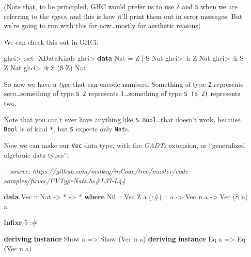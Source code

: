 \documentclass[]{article}
\newenvironment{Shaded}{}{}
\newcommand{\CommentTok}[1]{\textcolor[rgb]{0.38,0.63,0.69}{\textit{#1}}}
\newcommand{\DataTypeTok}[1]{\textcolor[rgb]{0.56,0.13,0.00}{#1}}
\newcommand{\DecValTok}[1]{\textcolor[rgb]{0.25,0.63,0.44}{#1}}
\newcommand{\FunctionTok}[1]{\textcolor[rgb]{0.02,0.16,0.49}{#1}}
\newcommand{\KeywordTok}[1]{\textcolor[rgb]{0.00,0.44,0.13}{\textbf{#1}}}
\newcommand{\NormalTok}[1]{#1}
\newcommand{\OtherTok}[1]{\textcolor[rgb]{0.00,0.44,0.13}{#1}}
\begin{document}
(Note that, to be principled, GHC would prefer us to use
\texttt{\textquotesingle{}Z} and \texttt{\textquotesingle{}S} when we are
referring to the \emph{types}, and this is how it'll print them out in error
messages. But we're going to run with this for now\ldots{}mostly for aesthetic
reasons)

We can check this out in GHCi:

\begin{Shaded}
\begin{Highlighting}[]
\NormalTok{ghci}\FunctionTok{>} \FunctionTok{:}\NormalTok{set }\FunctionTok{-}\DataTypeTok{XDataKinds}
\NormalTok{ghci}\FunctionTok{>} \KeywordTok{data} \DataTypeTok{Nat} \FunctionTok{=} \DataTypeTok{Z} \FunctionTok{|} \DataTypeTok{S} \DataTypeTok{Nat}
\NormalTok{ghci}\FunctionTok{>} \FunctionTok{:}\NormalTok{k }\DataTypeTok{Z}
\DataTypeTok{Nat}
\NormalTok{ghci}\FunctionTok{>} \FunctionTok{:}\NormalTok{k }\DataTypeTok{S} \DataTypeTok{Z}
\DataTypeTok{Nat}
\NormalTok{ghci}\FunctionTok{>} \FunctionTok{:}\NormalTok{k }\DataTypeTok{S}\NormalTok{ (}\DataTypeTok{S} \DataTypeTok{Z}\NormalTok{)}
\DataTypeTok{Nat}
\end{Highlighting}
\end{Shaded}

So now we have a \emph{type} that can encode numbers. Something of type
\texttt{Z} represents zero\ldots{}something of type \texttt{S\ Z} represents
1\ldots{}something of type \texttt{S\ (S\ Z)} represents two.

Note that you can't ever have anything like \texttt{S\ Bool}\ldots{}that doesn't
work, because \texttt{Bool} is of kind \texttt{*}, but \texttt{S} expects only
\texttt{Nat}s.

Now we can make our \texttt{Vec} data type, with the \emph{GADTs} extension, or
``generalized algebraic data types'':

\begin{Shaded}
\begin{Highlighting}[]
\CommentTok{-- source: https://github.com/mstksg/inCode/tree/master/code-samples/fixvec/FVTypeNats.hs#L37-L44}

\KeywordTok{data} \DataTypeTok{Vec}\OtherTok{ ::} \DataTypeTok{Nat} \OtherTok{->} \FunctionTok{*} \OtherTok{->} \FunctionTok{*} \KeywordTok{where}
    \DataTypeTok{Nil}\OtherTok{  ::} \DataTypeTok{Vec} \DataTypeTok{Z}\NormalTok{ a}
\OtherTok{    (:#) ::}\NormalTok{ a }\OtherTok{->} \DataTypeTok{Vec}\NormalTok{ n a }\OtherTok{->} \DataTypeTok{Vec}\NormalTok{ (}\DataTypeTok{S}\NormalTok{ n) a}

\KeywordTok{infixr} \DecValTok{5} \FunctionTok{:#}

\KeywordTok{deriving} \KeywordTok{instance} \DataTypeTok{Show}\NormalTok{ a }\OtherTok{=>} \DataTypeTok{Show}\NormalTok{ (}\DataTypeTok{Vec}\NormalTok{ n a)}
\KeywordTok{deriving} \KeywordTok{instance} \DataTypeTok{Eq}\NormalTok{ a }\OtherTok{=>} \DataTypeTok{Eq}\NormalTok{ (}\DataTypeTok{Vec}\NormalTok{ n a)}
\end{Highlighting}
\end{Shaded}
\end{document}
